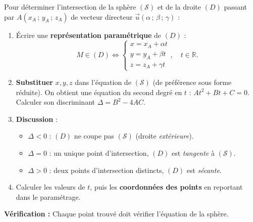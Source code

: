 \documentclass[11pt]{article}
\begin{document}
\begin{methode}
Pour déterminer l'intersection de la sphère $(\mathcal{S})$ et de la droite $(D)$ passant par $A(x_A\,;\,y_A\,;\,z_A)$ de vecteur directeur $\vec{u}(\alpha\,;\,\beta\,;\,\gamma)$ :
\begin{enumerate}
\item Écrire une \textbf{représentation paramétrique} de $(D)$ :
\[ M\in(D) \iff \begin{cases} x = x_A + \alpha t \\ y = y_A + \beta t \\ z = z_A + \gamma t \end{cases}, \quad t\in\mathbb{R}. \]
\item \textbf{Substituer} $x,y,z$ dans l'équation de $(\mathcal{S})$ (de préférence sous forme réduite). On obtient une équation du second degré en $t$ : $At^2+Bt+C=0$. Calculer son discriminant $\Delta = B^2-4AC$.
\item \textbf{Discussion} :
\begin{itemize}
\item $\Delta < 0$ : $(D)$ ne coupe pas $(\mathcal{S})$ (droite \emph{extérieure}).
\item $\Delta = 0$ : un unique point d'intersection, $(D)$ est \emph{tangente} à $(\mathcal{S})$.
\item $\Delta > 0$ : deux points d'intersection distincts, $(D)$ est \emph{sécante}.
\end{itemize}
\item Calculer les valeurs de $t$, puis les \textbf{coordonnées des points} en reportant dans le paramétrage.
\end{enumerate}
\textbf{Vérification :} Chaque point trouvé doit vérifier l'équation de la sphère.
\end{methode}
\end{document}
